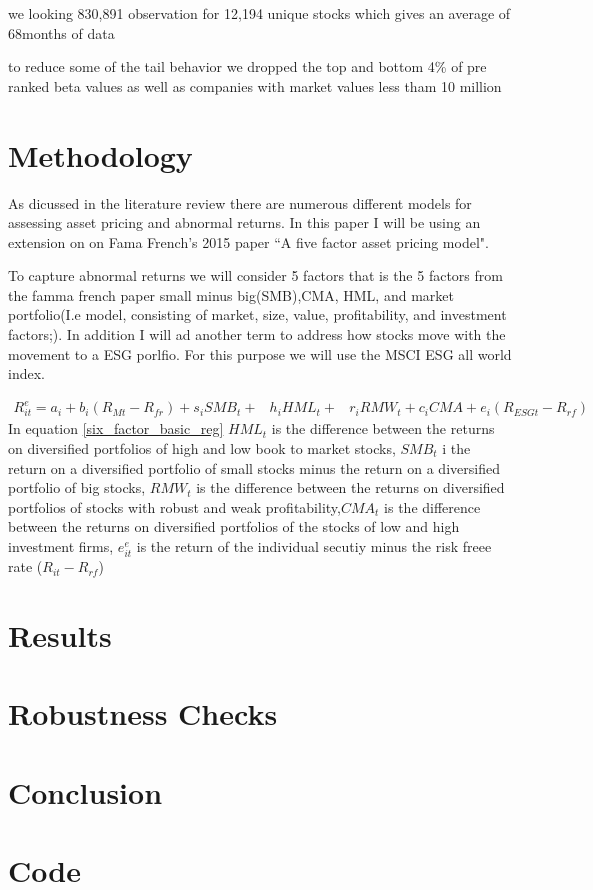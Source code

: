 \documentclass[12pt,oneside,reqno]{amsart}
\begin{document}
we looking 830,891 observation for  12,194 unique stocks which gives an average of 68months of data 

to reduce some of the tail behavior we dropped the top and bottom  4\% of pre ranked beta values as well as companies with market values less tham 10 million
\section{Methodology}
\label{Methodology}
As dicussed in the literature review there are numerous different models for assessing asset pricing and abnormal returns. In this paper I will be using an extension on on Fama French's 2015 paper ``A five factor asset pricing model".

To capture abnormal returns we will consider 5 factors that is the 5 factors from the famma french paper small minus big(SMB),CMA, HML, and market portfolio(I.e model, consisting of market, size, value, profitability, and investment factors;). In addition I will ad another term to address how stocks move with the movement to a ESG porlfio. For this purpose we will use the MSCI ESG all world index. 

\begin{equation}
\begin{split}
    R_{it}^e = a_i+b_i(R_{Mt}-R_{fr})+s_iSMB_t+ & h_iHML_t+ & r_iRMW_t+c_iCMA+e_i(R_{ESG t}-R_{rf})
    \end{split}
    \label{six_factor_basic_reg}
\end{equation}
In equation \eqref{six_factor_basic_reg} $HML_{t}$ is the difference between the returns on diversified portfolios of high and low book to market stocks, $SMB_{t}$ i the return on a diversified portfolio of small stocks minus the return on a diversified portfolio of big stocks, $RMW_t$ is the difference between the returns on diversified portfolios of stocks with robust and weak profitability,$CMA_{t}$ is the difference between the returns on diversified portfolios of the stocks of low and high investment firms, $e^e_{it}$ is the return of the individual secutiy minus the risk freee rate ($R_{it}-R_{rf}$)


\section{Results}
\label{Results}

\section{Robustness Checks}
\label{Robustness}

\section{Conclusion}
\label{Conclusion}
\section{Code}

\end{document}
